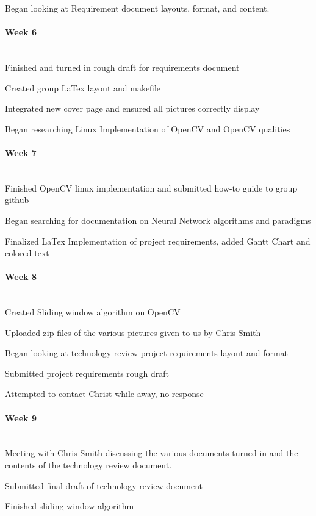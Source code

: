 \documentclass[article, onecolumn, draftclsnofoot,10pt, compsoc]{IEEEtran}
\begin{document}
Began looking at Requirement document layouts, format, and content. 

\paragraph{Week 6}
\mbox{}\\
Finished and turned in rough draft for requirements document 

Created group LaTex layout and makefile 

Integrated new cover page and ensured all pictures correctly display 

Began researching Linux Implementation of OpenCV and OpenCV qualities 

\paragraph{Week 7}
\mbox{}\\
Finished OpenCV linux implementation and submitted how-to guide to group github 

Began searching for documentation on Neural Network algorithms and paradigms 

Finalized LaTex Implementation of project requirements, added Gantt Chart and colored text 

\paragraph{Week 8}
\mbox{}\\
Created Sliding window algorithm on OpenCV 

Uploaded zip files of the various pictures given to us by Chris Smith 

Began looking at technology review project requirements layout and format 

Submitted project requirements rough draft 

Attempted to contact Christ while away, no response 

\paragraph{Week 9}
\mbox{}\\
Meeting with Chris Smith discussing the various documents turned in and the contents of the technology review document. 

Submitted final draft of technology review document 

Finished sliding window algorithm 
\end{document}
